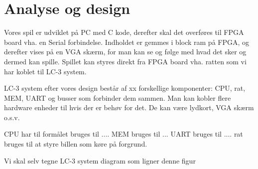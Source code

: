 \chapter{Analyse og design}\label{cha:analysedesign}
Vores spil er udviklet på PC med C kode, derefter skal det overføres til FPGA board vha. en Serial forbindelse. Indholdet er gemmes i block ram på FPGA, og derefter vises på en VGA skærm, for man kan se og følge med hvad det sker og dermed kan spille. Spillet kan styres direkt fra FPGA board vha. ratten som vi har koblet til LC-3 system. 

LC-3 system efter vores design består af xx forskellige komponenter: CPU, rat, MEM, UART og  busser som forbinder dem sammen. Man kan kobler flere hardware enheder til hvis der er behøv for det. De kan være lydkort, VGA skærm o.s.v.

CPU har til formålet bruges til ....
MEM bruges til ...
UART bruges til ....
rat bruges til at styre billen som køre på forgrund.


Vi skal selv tegne LC-3 system diagram som ligner denne figur

